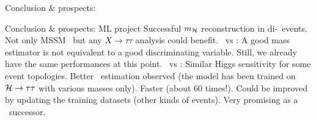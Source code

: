 \begin{frame}{Conclusion \& prospects: \HAtoTauTau}
\end{frame}

\begin{frame}{Conclusion \& prospects: ML project}
\manip Successful $m_{\mathcal{H}}$ reconstruction in di-\tau\ events.
\submanip Not only MSSM \HAtoTauTau\ but any $X\to\tau\tau$ analysis could benefit.
\manip \mml\ vs \mTtot:
\submanip A good mass estimator is not equivalent to a good discriminating variable.
\submanip Still, we already have the same performances at this point.
\manip \mml\ vs \msv:
\submanip Similar Higgs sensitivity for some event topologies.
\submanip Better \Zboson\ estimation observed (the model has been trained on $\mathcal{H}\to\tau\tau$ with various masses only).
\submanip Faster (about 60 times!).
\submanip Could be improved by updating the training datasets (other kinds of events).
\submanip Very promising as a \SVFIT\ successor.
\end{frame}

